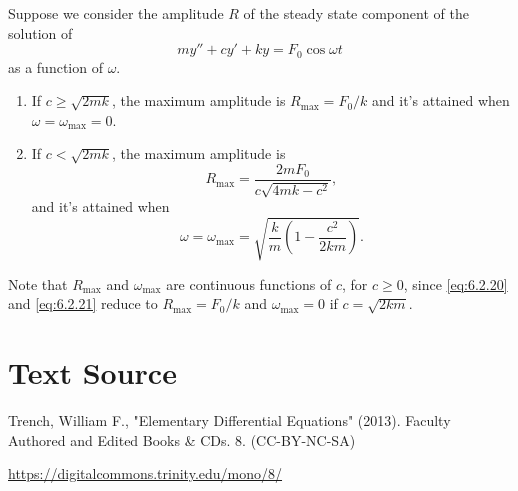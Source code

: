 \documentclass{ximera}
\begin{document}
 
\begin{theorem} \label{thmtype:6.2.1}
 Suppose we consider the amplitude $R$ of the steady state
component of the solution of
$$
my''+cy'+ky=F_0\cos\omega t
$$
as a function of $\omega$.
\begin{enumerate}
    \item
 If $c\geq\sqrt{2mk}$,  the maximum amplitude is
 $R_{\max}=F_0/k$ and it's attained when $\omega=
\omega_{\max}=0$.
\item
If $c<\sqrt{2mk}$, the maximum amplitude is
\begin{equation}\label{eq:6.2.20}
R_{\max}=\frac{2m F_0}{c\sqrt{4mk-c^2}},
\end{equation}
and it's attained when
\begin{equation}\label{eq:6.2.21}
\omega=\omega_{\max}=\sqrt{\frac{k}{m}\left(1-\frac{c^2}{2km}\right)}.
\end{equation}
\end{enumerate}
\end{theorem}
Note that $R_{\max}$ and $\omega_{\max}$ are continuous functions
of $c$, for $c\geq0$, since  \eqref{eq:6.2.20} and  \eqref{eq:6.2.21} reduce
to $R_{\max}=F_0/k$ and $\omega_{\max}=0$ if $c=\sqrt{2km}$.
 
 
\section*{Text Source}
Trench, William F., "Elementary Differential Equations" (2013). Faculty Authored and Edited Books \& CDs. 8. (CC-BY-NC-SA)
 
\href{https://digitalcommons.trinity.edu/mono/8/}{https://digitalcommons.trinity.edu/mono/8/}
 
\end{document}
